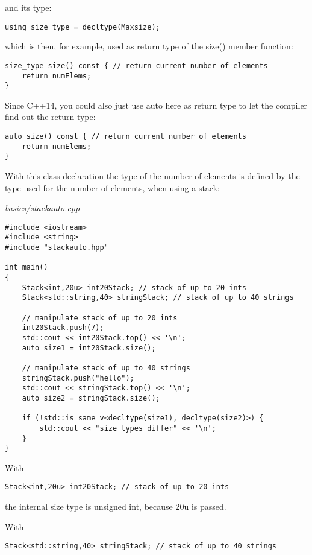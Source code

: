 and its type:

\begin{lstlisting}[style=styleCXX]
using size_type = decltype(Maxsize);
\end{lstlisting}

which is then, for example, used as return type of the size() member function:

\begin{lstlisting}[style=styleCXX]
size_type size() const { // return current number of elements
	return numElems;
}
\end{lstlisting}

Since C++14, you could also just use auto here as return type to let the compiler find out the return type:

\begin{lstlisting}[style=styleCXX]
auto size() const { // return current number of elements
	return numElems;
}
\end{lstlisting}

With this class declaration the type of the number of elements is defined by the type used for the number of elements, when using a stack:

\noindent
\textit{basics/stackauto.cpp}
\begin{lstlisting}[style=styleCXX]
#include <iostream>
#include <string>
#include "stackauto.hpp"

int main()
{
	Stack<int,20u> int20Stack; // stack of up to 20 ints
	Stack<std::string,40> stringStack; // stack of up to 40 strings
	
	// manipulate stack of up to 20 ints
	int20Stack.push(7);
	std::cout << int20Stack.top() << '\n';
	auto size1 = int20Stack.size();
	
	// manipulate stack of up to 40 strings
	stringStack.push("hello");
	std::cout << stringStack.top() << '\n';
	auto size2 = stringStack.size();
	
	if (!std::is_same_v<decltype(size1), decltype(size2)>) {
		std::cout << "size types differ" << '\n';
	}
}
\end{lstlisting}

With

\begin{lstlisting}[style=styleCXX]
Stack<int,20u> int20Stack; // stack of up to 20 ints
\end{lstlisting}

the internal size type is unsigned int, because 20u is passed.

With

\begin{lstlisting}[style=styleCXX]
Stack<std::string,40> stringStack; // stack of up to 40 strings
\end{lstlisting}

